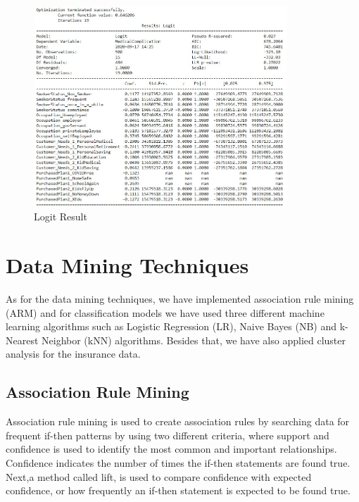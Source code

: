 \documentclass[11pt]{article}
\begin{document}
 \begin{figure}[H] 
     \centering
     \includegraphics[width=0.85\textwidth]{logit.jpg}
     \caption{Logit Result}
     \label{fig:logit.jpg}
 \end{figure}

\section{Data Mining Techniques}

\hspace{0.5cm} {As for the data mining techniques, we have implemented association rule mining (ARM) and for classification models we have used three different machine learning algorithms such as Logistic Regression (LR), Naive Bayes (NB) and k-Nearest Neighbor (kNN) algorithms. Besides that, we have also applied cluster analysis for the insurance data.}\vspace{0.3cm}


\subsection{Association Rule Mining}
\hspace{0.5cm} {Association rule mining is used to create association rules by searching data for frequent if-then patterns by using two different criteria, where support and confidence is used to identify the most common and important relationships. Confidence indicates the number of times the if-then statements are found true. Next,a method called lift, is used to compare confidence with expected confidence, or how frequently an if-then statement is expected to be found true.}\vspace{0.3cm}
\end{document}

